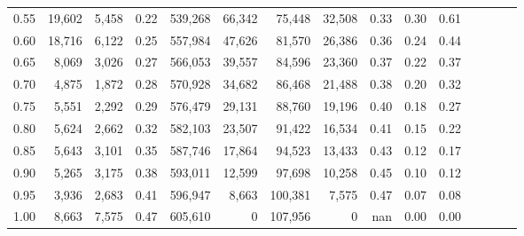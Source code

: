 \begin{tabular}{rrrcrrrrrrrrrrr}
0.55 &   19,602 &   5,458 &                                       0.22 &  539,268 &   66,342 &   75,448 &   32,508 &  0.33 &  0.30 &                         0.61 \\
0.60 &   18,716 &   6,122 &                                       0.25 &  557,984 &   47,626 &   81,570 &   26,386 &  0.36 &  0.24 &                         0.44 \\
0.65 &    8,069 &   3,026 &                                       0.27 &  566,053 &   39,557 &   84,596 &   23,360 &  0.37 &  0.22 &                         0.37 \\
0.70 &    4,875 &   1,872 &                                       0.28 &  570,928 &   34,682 &   86,468 &   21,488 &  0.38 &  0.20 &                         0.32 \\
0.75 &    5,551 &   2,292 &                                       0.29 &  576,479 &   29,131 &   88,760 &   19,196 &  0.40 &  0.18 &                         0.27 \\
0.80 &    5,624 &   2,662 &                                       0.32 &  582,103 &   23,507 &   91,422 &   16,534 &  0.41 &  0.15 &                         0.22 \\
0.85 &    5,643 &   3,101 &                                       0.35 &  587,746 &   17,864 &   94,523 &   13,433 &  0.43 &  0.12 &                         0.17 \\
0.90 &    5,265 &   3,175 &                                       0.38 &  593,011 &   12,599 &   97,698 &   10,258 &  0.45 &  0.10 &                         0.12 \\
0.95 &    3,936 &   2,683 &                                       0.41 &  596,947 &    8,663 &  100,381 &    7,575 &  0.47 &  0.07 &                         0.08 \\
1.00 &    8,663 &   7,575 &                                       0.47 &  605,610 &        0 &  107,956 &        0 &   nan &  0.00 &                         0.00 \\
\bottomrule
\end{tabular}
